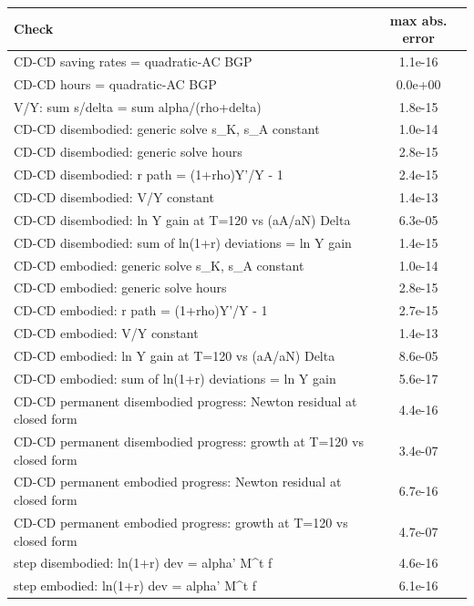 \begin{tabular}{lc}\toprule Check & max abs. error\\\midrule
CD-CD saving rates = quadratic-AC BGP & 1.1e-16\\
CD-CD hours = quadratic-AC BGP & 0.0e+00\\
V/Y: sum s/delta = sum alpha/(rho+delta) & 1.8e-15\\
CD-CD disembodied: generic solve s_K, s_A constant & 1.0e-14\\
CD-CD disembodied: generic solve hours & 2.8e-15\\
CD-CD disembodied: r path = (1+rho)Y'/Y - 1 & 2.4e-15\\
CD-CD disembodied: V/Y constant & 1.4e-13\\
CD-CD disembodied: ln Y gain at T=120 vs (aA/aN) Delta & 6.3e-05\\
CD-CD disembodied: sum of ln(1+r) deviations = ln Y gain & 1.4e-15\\
CD-CD embodied: generic solve s_K, s_A constant & 1.0e-14\\
CD-CD embodied: generic solve hours & 2.8e-15\\
CD-CD embodied: r path = (1+rho)Y'/Y - 1 & 2.7e-15\\
CD-CD embodied: V/Y constant & 1.4e-13\\
CD-CD embodied: ln Y gain at T=120 vs (aA/aN) Delta & 8.6e-05\\
CD-CD embodied: sum of ln(1+r) deviations = ln Y gain & 5.6e-17\\
CD-CD permanent disembodied progress: Newton residual at closed form & 4.4e-16\\
CD-CD permanent disembodied progress: growth at T=120 vs closed form & 3.4e-07\\
CD-CD permanent embodied progress: Newton residual at closed form & 6.7e-16\\
CD-CD permanent embodied progress: growth at T=120 vs closed form & 4.7e-07\\
step disembodied: ln(1+r) dev = alpha' M^t f & 4.6e-16\\
step embodied: ln(1+r) dev = alpha' M^t f & 6.1e-16\\
\bottomrule\end{tabular}
